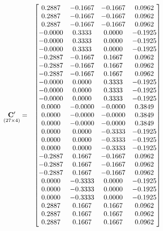 \documentclass{glimmpse-report}
\begin{document}
\begin{eqnarray*}
\underset{\left(27\times4\right)}{\mathbf{C}'} & = & \begin{bmatrix}0.2887 & -0.1667 & -0.1667 & 0.0962\protect\\
0.2887 & -0.1667 & -0.1667 & 0.0962\protect\\
0.2887 & -0.1667 & -0.1667 & 0.0962\protect\\
-0.0000 & 0.3333 & 0.0000 & -0.1925\protect\\
-0.0000 & 0.3333 & 0.0000 & -0.1925\protect\\
-0.0000 & 0.3333 & 0.0000 & -0.1925\protect\\
-0.2887 & -0.1667 & 0.1667 & 0.0962\protect\\
-0.2887 & -0.1667 & 0.1667 & 0.0962\protect\\
-0.2887 & -0.1667 & 0.1667 & 0.0962\protect\\
-0.0000 & 0.0000 & 0.3333 & -0.1925\protect\\
-0.0000 & 0.0000 & 0.3333 & -0.1925\protect\\
-0.0000 & 0.0000 & 0.3333 & -0.1925\protect\\
0.0000 & -0.0000 & -0.0000 & 0.3849\protect\\
0.0000 & -0.0000 & -0.0000 & 0.3849\protect\\
0.0000 & -0.0000 & -0.0000 & 0.3849\protect\\
0.0000 & 0.0000 & -0.3333 & -0.1925\protect\\
0.0000 & 0.0000 & -0.3333 & -0.1925\protect\\
0.0000 & 0.0000 & -0.3333 & -0.1925\protect\\
-0.2887 & 0.1667 & -0.1667 & 0.0962\protect\\
-0.2887 & 0.1667 & -0.1667 & 0.0962\protect\\
-0.2887 & 0.1667 & -0.1667 & 0.0962\protect\\
0.0000 & -0.3333 & 0.0000 & -0.1925\protect\\
0.0000 & -0.3333 & 0.0000 & -0.1925\protect\\
0.0000 & -0.3333 & 0.0000 & -0.1925\protect\\
0.2887 & 0.1667 & 0.1667 & 0.0962\protect\\
0.2887 & 0.1667 & 0.1667 & 0.0962\protect\\
0.2887 & 0.1667 & 0.1667 & 0.0962\protect\\
\end{bmatrix}
\end{eqnarray*}
\end{document}
